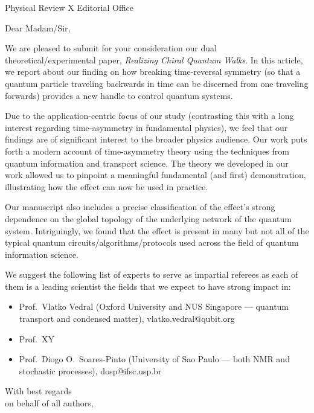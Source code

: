 \documentclass[11pt,a4paper]{letter}
\begin{document}
\begin{letter}{%
    Physical Review X Editorial Office
  }
\opening{Dear Madam/Sir,}

\thispagestyle{fancy}%



We are pleased to submit for your consideration our dual
theoretical/experimental paper,
{\it Realizing Chiral Quantum Walks}.
In this article, we report about our finding on how breaking
time-reversal symmetry (so that a quantum particle traveling backwards
in time can be discerned from one traveling forwards) provides a new
handle to control quantum systems.


Due to the application-centric focus of our study (contrasting this
with a long interest regarding time-asymmetry in fundamental physics),
we feel that our findings are of significant interest to the broader
physics audience.  Our work puts forth a modern account of
time-asymmetry theory using the techniques from quantum information
and transport science. The theory we developed in our work allowed us
to pinpoint a meaningful fundamental (and first) demonstration,
illustrating how the effect can now be used in practice.

Our manuscript also includes a precise classification of the effect's
strong dependence on the global topology of the underlying network of
the quantum system.  Intriguingly, we found that the effect is present
in many but not all of the typical quantum
circuits/algorithms/protocols used across the field of quantum
information science.

We suggest the following list of experts to serve as impartial
referees as each of them is a leading scientist the fields that we
expect to have strong impact in:
\begin{itemize}
    \setlength{\itemsep}{0pt}%
    \setlength{\parskip}{0pt}
        \item Prof.~Vlatko Vedral (Oxford University and NUS Singapore ---
quantum transport and condensed matter), vlatko.vedral@qubit.org
       \item Prof.~XY
	\item  Prof.~Diogo O.~Soares-Pinto (University of Sao Paulo
--- both NMR and stochastic processes), 
dosp@ifsc.usp.br	
\end{itemize}

\closing{With best regards\\ on behalf of all authors,}
\end{letter}
\end{document}
